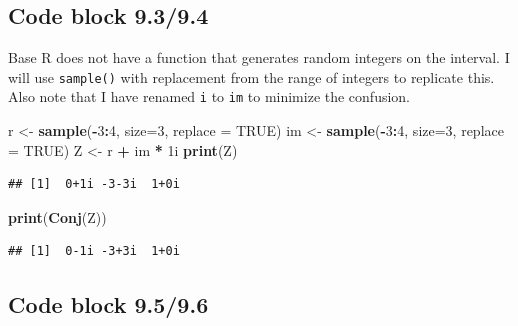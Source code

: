 \documentclass[
]{book}
\newenvironment{Shaded}{\begin{snugshade}}{\end{snugshade}}
\newcommand{\DataTypeTok}[1]{\textcolor[rgb]{0.13,0.29,0.53}{#1}}
\newcommand{\DecValTok}[1]{\textcolor[rgb]{0.00,0.00,0.81}{#1}}
\newcommand{\KeywordTok}[1]{\textcolor[rgb]{0.13,0.29,0.53}{\textbf{#1}}}
\newcommand{\NormalTok}[1]{#1}
\newcommand{\OperatorTok}[1]{\textcolor[rgb]{0.81,0.36,0.00}{\textbf{#1}}}
\newcommand{\OtherTok}[1]{\textcolor[rgb]{0.56,0.35,0.01}{#1}}
\newcommand{\StringTok}[1]{\textcolor[rgb]{0.31,0.60,0.02}{#1}}
\begin{document}
\hypertarget{code-block-9.39.4}{%
\subsection*{Code block 9.3/9.4}\label{code-block-9.39.4}}

Base R does not have a function that generates random integers on the interval. I will use \texttt{sample()} with replacement from the range of integers to replicate this. Also note that I have renamed \texttt{i} to \texttt{im} to minimize the confusion.

\begin{Shaded}
\begin{Highlighting}[]
\NormalTok{r \textless{}{-}}\StringTok{ }\KeywordTok{sample}\NormalTok{(}\OperatorTok{{-}}\DecValTok{3}\OperatorTok{:}\DecValTok{4}\NormalTok{, }\DataTypeTok{size=}\DecValTok{3}\NormalTok{, }\DataTypeTok{replace =} \OtherTok{TRUE}\NormalTok{)}
\NormalTok{im \textless{}{-}}\StringTok{ }\KeywordTok{sample}\NormalTok{(}\OperatorTok{{-}}\DecValTok{3}\OperatorTok{:}\DecValTok{4}\NormalTok{, }\DataTypeTok{size=}\DecValTok{3}\NormalTok{, }\DataTypeTok{replace =} \OtherTok{TRUE}\NormalTok{)}
\NormalTok{Z \textless{}{-}}\StringTok{ }\NormalTok{r }\OperatorTok{+}\StringTok{ }\NormalTok{im }\OperatorTok{*}\StringTok{ }\NormalTok{1i}
\KeywordTok{print}\NormalTok{(Z)}
\end{Highlighting}
\end{Shaded}

\begin{verbatim}
## [1]  0+1i -3-3i  1+0i
\end{verbatim}

\begin{Shaded}
\begin{Highlighting}[]
\KeywordTok{print}\NormalTok{(}\KeywordTok{Conj}\NormalTok{(Z))}
\end{Highlighting}
\end{Shaded}

\begin{verbatim}
## [1]  0-1i -3+3i  1+0i
\end{verbatim}

\hypertarget{code-block-9.59.6}{%
\subsection*{Code block 9.5/9.6}\label{code-block-9.59.6}}
\end{document}
